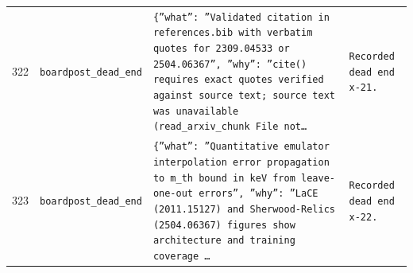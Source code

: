 \documentclass[11pt,a4paper]{article}
\begin{document}
\begin{longtable}{@{}p{}p{}p{}p{}@{}}
322 & \texttt{board}\newline\texttt{post\_\allowbreak{}dead\_\allowbreak{}end} & \texttt{\{''what'':\allowbreak{} ''Validated citation in references.bib with verbatim quotes for 2309.04533 or 2504.06367'',\allowbreak{} ''why'':\allowbreak{} ''cite()\allowbreak{} requires exact quotes verified against source text;\allowbreak{} source text was unavailable (read\_\allowbreak{}arxiv\_\allowbreak{}chunk File not\ldots{}\allowbreak{}} & \texttt{Recorded dead end x-21.} \\
323 & \texttt{board}\newline\texttt{post\_\allowbreak{}dead\_\allowbreak{}end} & \texttt{\{''what'':\allowbreak{} ''Quantitative emulator interpolation error propagation to m\_\allowbreak{}th bound in keV from leave-one-out errors'',\allowbreak{} ''why'':\allowbreak{} ''LaCE (2011.15127)\allowbreak{} and Sherwood-Relics (2504.06367)\allowbreak{} figures show architecture and training coverage \ldots{}\allowbreak{}} & \texttt{Recorded dead end x-22.} \\

\end{longtable}
\end{document}
